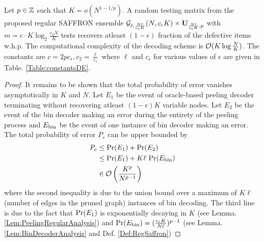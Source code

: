 \documentclass[conference,twocolumn]{IEEEtran}
\def\ceps{c_{\epsilon}}
\def\proofgap{-3ex}
\begin{document}
\begin{theorem}
\label{Thm:NoiselessMain}
Let $p\in\mathbb{Z}$ such that $K=o(N^{1-1/p})$. A random testing matrix from the proposed regular SAFFRON ensemble $\mc{G}_{\ell,\frac{N\ell}{\ceps K}}(N,\ceps K)\times \mbf{U}_{\frac{N\ell}{\ceps K},p}$ with $m=c\cdot K\log_{2}\frac{c_2 N}{K}$ tests recovers atleast $(1-\epsilon)$ fraction of the defective items w.h.p. The computational complexity of the decoding scheme is $\mathcal{O}(K\log \frac{N}{K})$. The constants are $c=2p\ceps, c_2=\frac{\ell}{\ceps}$ where $\ell$ and $\ceps$ for various values of $\epsilon$ are given in Table. \ref{Table:constantsDE}.%
\end{theorem}
\vspace{\proofgap}
\begin{proof}
It remains to be shown that the total probability of error vanishes asymptotically in $K$ and $N$. Let $E_1$ be the event of oracle-based peeling decoder terminating without recovering atleast $(1-\epsilon)K$ variable nodes. Let $E_2$ be the event of the bin decoder making an error during the entirety of the peeling process and $E_{\text{bin}}$ be the event of one instance of bin decoder making an error. The total probability of error $P_e$ can be upper bounded by
\begin{align*}
P_e &\leq \text{Pr}(E_1)+ \text{Pr}(E_2)\\
               &\leq \text{Pr}(E_1)+ K\ell\text{ Pr}(E_{\text{bin}})\\
               &\in \mathcal{O}\left(\frac{K^{p}}{N^{p-1}}\right)
\end{align*}
where the second inequality is due to the union bound over a maximum of $K\ell$ (number of edges in the pruned graph) instances of bin decoding. The third line is due to the fact that $\text{Pr}(E_1)$ is exponentially decaying in $K$ (see Lemma. \ref{Lem:PeelingRegularAnalysis}) and $\tx{Pr}(E_{\tx{bin}})=(\frac{\ceps K}{N\ell})^{p-1}$ (see Lemma. \ref{Lem:BinDecoderAnalysis} and Def. \ref{Def:RegSaffron})
\end{proof}
\end{document}
